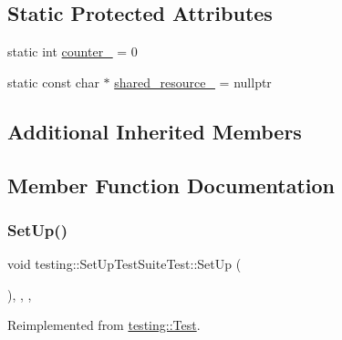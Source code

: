 \subsection*{Static Protected Attributes}
\begin{DoxyCompactItemize}
\item 
static int \mbox{\hyperlink{classtesting_1_1_set_up_test_suite_test_a13b24510288241cd6f0b3bc71e716da5}{counter\+\_\+}} = 0
\item 
static const char $\ast$ \mbox{\hyperlink{classtesting_1_1_set_up_test_suite_test_a91d5526233a6cbbe776cdfe80f39492a}{shared\+\_\+resource\+\_\+}} = nullptr
\end{DoxyCompactItemize}
\subsection*{Additional Inherited Members}


\subsection{Member Function Documentation}
\mbox{\label{classtesting_1_1_set_up_test_suite_test_ac01379a3be015db77866fe224807b219}} 
\subsubsection{\texorpdfstring{SetUp()}{SetUp()}\hspace{0.1cm}{\footnotesize\ttfamily [1/2]}}
{\footnotesize\ttfamily void testing\+::\+Set\+Up\+Test\+Suite\+Test\+::\+Set\+Up (\begin{DoxyParamCaption}{ }\end{DoxyParamCaption})\hspace{0.3cm}{\ttfamily [inline]}, {\ttfamily [override]}, {\ttfamily [protected]}, {\ttfamily [virtual]}}



Reimplemented from \mbox{\hyperlink{classtesting_1_1_test_a190315150c303ddf801313fd1a777733}{testing\+::\+Test}}.

\mbox{\label{classtesting_1_1_set_up_test_suite_test_ac01379a3be015db77866fe224807b219}} 
